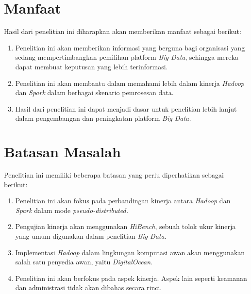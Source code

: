 \section{Manfaat}
Hasil dari penelitian ini diharapkan akan memberikan manfaat sebagai berikut:
\begin{enumerate}
	\item 
	Penelitian ini akan memberikan informasi yang berguna bagi organisasi yang sedang mempertimbangkan pemilihan platform \textit{Big Data}, sehingga mereka dapat membuat keputusan yang lebih terinformasi.	
	\item
	Penelitian ini akan membantu dalam memahami lebih dalam kinerja \textit{Hadoop} dan \textit{Spark} dalam berbagai skenario pemrosesan data.
	\item
	Hasil dari penelitian ini dapat menjadi dasar untuk penelitian lebih lanjut dalam pengembangan dan peningkatan platform \textit{Big Data.}
\end{enumerate}

\section{Batasan Masalah}
Penelitian ini memiliki beberapa batasan yang perlu diperhatikan sebagai berikut:
	\begin{enumerate}
		\item 
		Penelitian ini akan fokus pada perbandingan kinerja antara \textit{Hadoop} dan \textit{Spark} dalam mode \textit{pseudo-distributed.}
		\item
		Pengujian kinerja akan menggunakan \textit{HiBench}, sebuah tolok ukur kinerja yang umum digunakan dalam penelitian \textit{Big Data.}
		\item
		Implementasi \textit{Hadoop} dalam lingkungan komputasi awan akan menggunakan salah satu penyedia awan, yaitu \textit{DigitalOcean}.
		\item
		Penelitian ini akan berfokus pada aspek kinerja. Aspek lain seperti keamanan dan administrasi tidak akan dibahas secara rinci.
	\end{enumerate}

%
%
%
